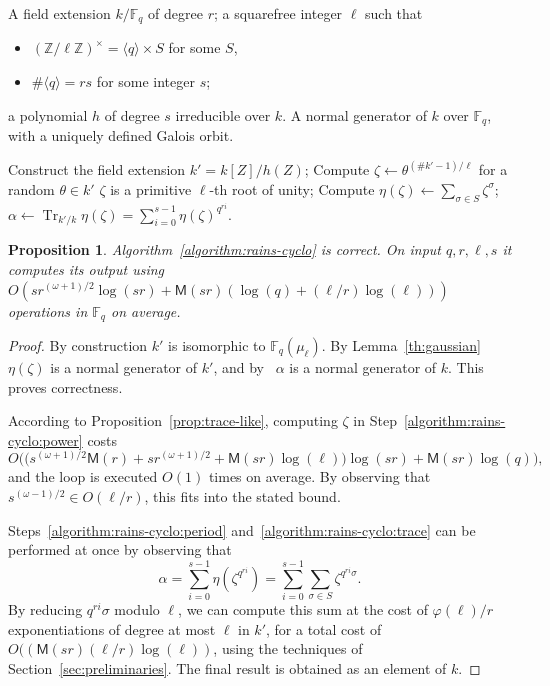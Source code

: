 \documentclass{mcom-l}
\theoremstyle{plain}
\newtheorem{proposition}[theorem]{Proposition}
\theoremstyle{definition}
\DeclareMathOperator{\trace}{Tr} %
\newcommand{\Z}{\ensuremath{\mathbb{Z}}}
\newcommand{\F}{\ensuremath{\mathbb{F}}}
\newcommand{\MM}{\ensuremath{\mathsf{M}}}
\newcommand{\euler}{\ensuremath{\varphi}}
\newcounter{algorithm}
\begin{document}
\begin{algorithm}
  \label{algorithm:rains-cyclo}
  \begin{algorithmic}[1]
    \REQUIRE A field extension $k/\F_q$ of degree $r$; a squarefree
    integer $\ell$ such that
    \begin{itemize}
    \item $(\Z/\ell\Z)^\times = \langle q\rangle \times S$ for some $S$,
    \item $\#\langle q\rangle = rs$ for some integer $s$;
    \end{itemize}
    a polynomial $h$ of degree $s$ irreducible over $k$.
    \ENSURE A normal generator of $k$ over $\F_q$,
    with a uniquely defined Galois orbit.
    
    \STATE Construct the field extension $k'=k[Z]/h(Z)$;
    \REPEAT
    \STATE\label{algorithm:rains-cyclo:power} Compute $\zeta\leftarrow \theta^{(\#k'-1)/\ell}$ for a random $\theta\in k'$
    \UNTIL $\zeta$ is a primitive $\ell$-th root of unity;
    \STATE\label{algorithm:rains-cyclo:period} Compute $\eta(\zeta) \leftarrow \sum_{\sigma\in S}\zeta^\sigma$;
    \RETURN\label{algorithm:rains-cyclo:trace} $\alpha \leftarrow \trace_{k'/k}\eta(\zeta) = \sum_{i=0}^{s-1}\eta(\zeta)^{q^{ri}}$.
  \end{algorithmic}
\end{algorithm}

\begin{proposition}
  Algorithm~\ref{algorithm:rains-cyclo} is correct. On input
  $q,r,\ell,s$ it computes its output using
  $O(sr^{(\omega+1)/2}\log(sr) + \MM(sr)(\log(q) + (\ell/r)\log(\ell)))$ operations in $\F_q$ on average.
\end{proposition}
\begin{proof}
  By construction $k'$ is isomorphic to $\F_q(\mu_\ell)$. By
  Lemma~\ref{th:gaussian} $\eta(\zeta)$ is a normal generator of $k'$,
  and by~\cite[Prop.~5.2.3.1]{mullen2013handbook} $\alpha$ is a
  normal generator of $k$. This proves correctness.

  According to Proposition~\ref{prop:trace-like}, computing $\zeta$
  in Step~\ref{algorithm:rains-cyclo:power}
  costs
  $$O\bigl(\bigl(s^{(\omega+1)/2}\MM(r) + sr^{(\omega+1)/2}
  +\MM(sr)\log(\ell)\bigr)\log(sr)+\MM(sr)\log(q)\bigr),
  $$
  and the loop is executed $O(1)$ times on average. %
  By observing that $s^{(\omega-1)/2}\in O(\ell/r)$, this fits into
  the stated bound.
  
  Steps~\ref{algorithm:rains-cyclo:period}
  and~\ref{algorithm:rains-cyclo:trace} can be performed at once by
  observing that
  \[\alpha = \sum_{i=0}^{s-1}\eta(\zeta^{q^{ri}})= \sum_{i=0}^{s-1}\sum_{\sigma\in S}\zeta^{q^{ri}\sigma}.\]
  By reducing $q^{ri}\sigma$ modulo $\ell$, we can compute this sum at
  the cost of $\euler(\ell)/r$ exponentiations of degree at most
  $\ell$ in $k'$, for a total cost of
  $O((\MM(sr)(\ell/r)\log(\ell))$,
  using the techniques of Section~\ref{sec:preliminaries}.
  The final result is obtained as an element of $k$.
\end{proof}
\end{document}
